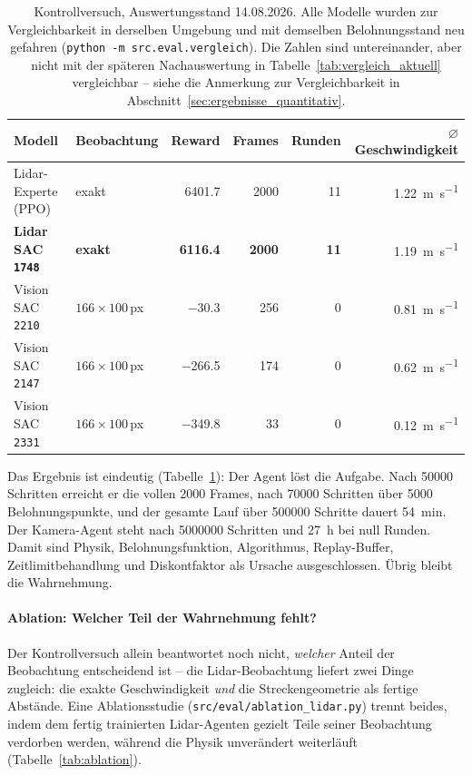 \begin{table}[htbp]
  \centering
  \caption{Kontrollversuch, Auswertungsstand 14.08.2026. Alle Modelle wurden zur Vergleichbarkeit in derselben Umgebung und mit demselben Belohnungsstand neu gefahren (\texttt{python -m src.eval.vergleich}). Die Zahlen sind untereinander, aber nicht mit der späteren Nachauswertung in Tabelle~\ref{tab:vergleich_aktuell} vergleichbar -- siehe die Anmerkung zur Vergleichbarkeit in Abschnitt~\ref{sec:ergebnisse_quantitativ}.}
  \label{tab:kontrollversuch}
  \small
  \begin{tabular}{@{}l l r r r r@{}}
    \toprule
    \textbf{Modell} & \textbf{Beobachtung} & \textbf{Reward} & \textbf{Frames} & \textbf{Runden} & \textbf{$\varnothing$ Geschwindigkeit} \\
    \midrule
    Lidar-Experte (PPO)        & exakt              & \num{6401.7}  & \num{2000} & \num{11} & \SI{1.22}{\meter\per\second} \\
    \textbf{Lidar SAC \texttt{1748}} & \textbf{exakt} & \textbf{\num{6116.4}} & \textbf{\num{2000}} & \textbf{\num{11}} & \SI{1.19}{\meter\per\second} \\
    Vision SAC \texttt{2210}   & $166\times100$\,px & \num{-30.3}   & \num{256}  & \num{0}  & \SI{0.81}{\meter\per\second} \\
    Vision SAC \texttt{2147}   & $166\times100$\,px & \num{-266.5}  & \num{174}  & \num{0}  & \SI{0.62}{\meter\per\second} \\
    Vision SAC \texttt{2331}   & $166\times100$\,px & \num{-349.8}  & \num{33}   & \num{0}  & \SI{0.12}{\meter\per\second} \\
    \bottomrule
  \end{tabular}
\end{table}

Das Ergebnis ist eindeutig (Tabelle~\ref{tab:kontrollversuch}): Der Agent löst die Aufgabe. Nach \num{50000} Schritten erreicht er die vollen \num{2000} Frames, nach \num{70000} Schritten über \num{5000} Belohnungspunkte, und der gesamte Lauf über \num{500000} Schritte dauert \SI{54}{\minute}. Der Kamera-Agent steht nach \num{5000000} Schritten und \SI{27}{\hour} bei null Runden. Damit sind Physik, Belohnungsfunktion, Algorithmus, Replay-Buffer, Zeitlimitbehandlung und Diskontfaktor als Ursache ausgeschlossen. Übrig bleibt die Wahrnehmung.

\paragraph{Ablation: Welcher Teil der Wahrnehmung fehlt?}
Der Kontrollversuch allein beantwortet noch nicht, \emph{welcher} Anteil der Beobachtung entscheidend ist -- die Lidar-Beobachtung liefert zwei Dinge zugleich: die exakte Geschwindigkeit \emph{und} die Streckengeometrie als fertige Abstände. Eine Ablationsstudie (\texttt{src/eval/ablation\_lidar.py}) trennt beides, indem dem fertig trainierten Lidar-Agenten gezielt Teile seiner Beobachtung verdorben werden, während die Physik unverändert weiterläuft (Tabelle~\ref{tab:ablation}).

